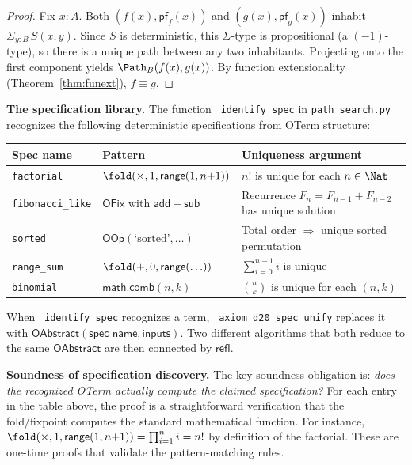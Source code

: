 \begin{proof}
Fix $x : A$.  Both $(f(x), \mathsf{pf}_f(x))$ and
$(g(x), \mathsf{pf}_g(x))$ inhabit $\Sigma_{y:B}\, S(x,y)$.  Since
$S$ is deterministic, this $\Sigma$-type is propositional (a
$(-1)$-type), so there is a unique path between any two inhabitants.
Projecting onto the first component yields
$\Path_B(f(x), g(x))$.  By function extensionality
(Theorem~\ref{thm:funext}), $f \equiv g$.
\end{proof}

\textbf{The specification library.}
The function \texttt{\_identify\_spec} in \texttt{path\_search.py}
recognizes the following deterministic specifications from OTerm
structure:

\begin{center}
\begin{tabular}{lll}
\toprule
\textbf{Spec name} & \textbf{Pattern} & \textbf{Uniqueness argument} \\
\midrule
\texttt{factorial} & $\fold(\times, 1, \mathsf{range}(1, n{+}1))$
  & $n!$ is unique for each $n \in \Nat$ \\
\texttt{fibonacci\_like} & $\mathsf{OFix}$ with $\mathsf{add}+\mathsf{sub}$
  & Recurrence $F_n = F_{n-1}+F_{n-2}$ has unique solution \\
\texttt{sorted} & $\mathsf{OOp}(\text{`sorted'}, \ldots)$
  & Total order $\Rightarrow$ unique sorted permutation \\
\texttt{range\_sum} & $\fold(+, 0, \mathsf{range}(\ldots))$
  & $\sum_{i=0}^{n-1} i$ is unique \\
\texttt{binomial} & $\mathsf{math.comb}(n, k)$
  & $\binom{n}{k}$ is unique for each $(n,k)$ \\
\bottomrule
\end{tabular}
\end{center}

When \texttt{\_identify\_spec} recognizes a term, \texttt{\_axiom\_d20\_spec\_unify}
replaces it with $\mathsf{OAbstract}(\mathsf{spec\_name}, \mathsf{inputs})$.
Two different algorithms that both reduce to the same
$\mathsf{OAbstract}$ are then connected by $\mathsf{refl}$.

\textbf{Soundness of specification discovery.}
The key soundness obligation is: \emph{does the recognized OTerm
actually compute the claimed specification?}  For each entry in the
table above, the proof is a straightforward verification that the
fold/fixpoint computes the standard mathematical function.  For
instance, $\fold(\times, 1, \mathsf{range}(1, n{+}1)) = \prod_{i=1}^{n} i
= n!$ by definition of the factorial.  These are one-time proofs
that validate the pattern-matching rules.

